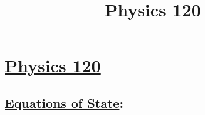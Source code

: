 \documentclass[fleqn]{article}
\title{\vspace{1mm}Physics 120}
\date{}
\begin{document}
\newcommand{\myint}[4]{\int_{#1}^{#2} \!  #3  \, \mathrm{d} #4}
\newcommand{\paren}[1]{\!\left({#1}\right)}
\newcommand{\commutator}[2]{\left[ #1\, , #2\right]}
\newcommand{\expec}[1]{\! \left\langle {#1}\right\rangle}
\newcommand{\expect}[1]{\! \langle {#1}\rangle}
\newcommand{\mysum}[3]{\sum_{#1}^{#2} \, #3 }
\newcommand{\pdiv}[3]{ \frac{\partial^{#3}{#1}}{\partial{#2}^{#3} } }
\newcommand{\deriv}[3]{ \frac{\mathrm{d}^{#3}{#1}}{\mathrm{d}{#2}^{#3} } }
\newcommand{\braket}[1]{\!\left| #1 \right\rangle}
\newcommand{\half}[0]{\frac{1}{2}}


\section*{\centering \underline{Physics 120}}
\begin{multicols*}{3} %
\subsection*{ \centering \underline{Equations of State}:}















\end{multicols*}
\end{document}
